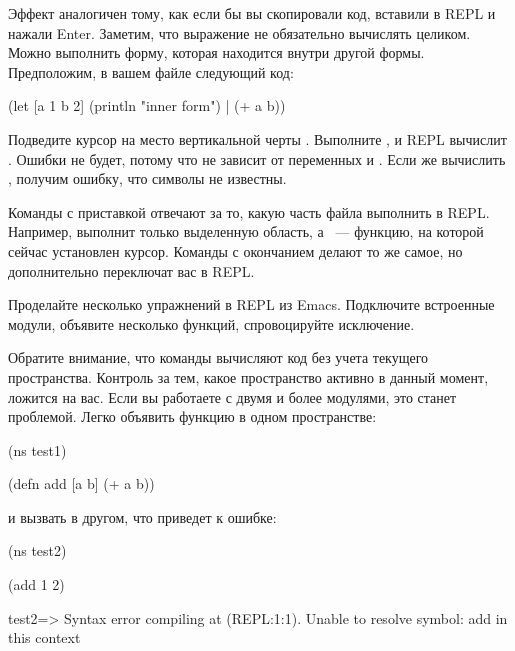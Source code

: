 Эффект аналогичен тому, как если бы вы скопировали код, вставили в REPL и нажали Enter. Заметим, что выражение не обязательно вычислять целиком. Можно выполнить форму, которая находится внутри другой формы. Предположим, в вашем файле следующий код:

\begin{english}
  \begin{clojure/lines}
(let [a 1 b 2]
  (println "inner form") |
  (+ a b))
  \end{clojure/lines}
\end{english}

Подведите курсор на место вертикальной черты . Выполните , и REPL вычислит . Ошибки не будет, потому что  не зависит от переменных  и . Если же вычислить , получим ошибку, что символы не известны.

Команды с приставкой  отвечают за то, какую часть файла выполнить в REPL. Например,  выполнит только выделенную область, а ~--- функцию, на которой сейчас установлен курсор. Команды с окончанием  делают то же самое, но дополнительно переключат вас в REPL.

Проделайте несколько упражнений в REPL из Emacs. Подключите встроенные модули, объявите несколько функций, спровоцируйте исключение.

Обратите внимание, что команды  вычисляют код без учета текущего пространства. Контроль за тем, какое пространство активно в данный момент, ложится на вас. Если вы работаете с двумя и более модулями, это станет проблемой. Легко объявить функцию в одном пространстве:

\begin{english}
  \begin{clojure}
(ns test1)

(defn add [a b]
  (+ a b))
  \end{clojure}
\end{english}

\noindent
и вызвать в другом, что приведет к ошибке:

\begin{english}
  \begin{text}
(ns test2)

(add 1 2)

test2=> Syntax error compiling at (REPL:1:1).
Unable to resolve symbol: add in this context
  \end{text}
\end{english}

